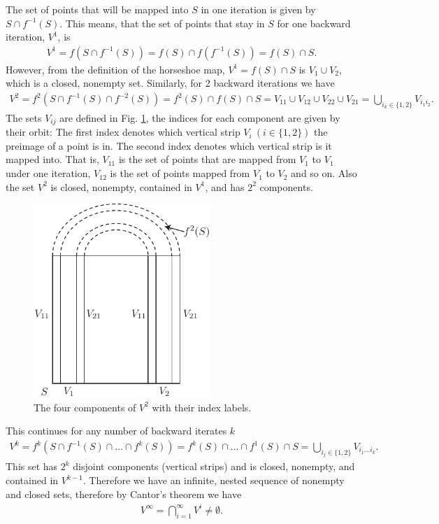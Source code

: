 The set of points that will be mapped into $S$ in one iteration is given by $S\cap f^{-1}(S)$. This means, that the set of points that stay in $S$ for one backward iteration, $V^1$, is
\begin{align}
V^1=f(S\cap f^{-1}(S)) = f(S)\cap f(f^{-1}(S)) = f(S)\cap S.
\end{align}
However, from the definition of the horseshoe map, $V^1 = f(S)\cap S$ is $V_1\cup V_2$, which is a closed, nonempty set. Similarly, for 2 backward iterations we have
\begin{align}
	V^{2} = f^{2}\left(S \cap f^{-1}(S) \cap f^{-2}(S) \right) = f^{2}(S) \cap f(S) \cap S  = V_{11} \cup V_{12} \cup V_{22} \cup V_{21} = \bigcup_{i_k \in \{1,2\}} V_{i_1i_2}.
\end{align}
The sets $V_{ij}$ are defined in Fig. \ref{fig:V_subsets}, the indices for each component are given by their orbit: The first index denotes which vertical strip $V_i\ (i\in \{1,2\})$ the preimage of a point is in. The second index denotes which vertical strip is it mapped into. That is, $V_{11}$ is the set of points that are mapped from $V_1$ to $V_1$ under one iteration, $V_{12}$ is the set of points mapped from $V_1$ to $V_2$ and so on. Also the set $V^{2}$ is closed, nonempty, contained in $V^{1}$, and has $2^2$ components.
\begin{figure}[h!]
	\centering
	\includegraphics[width=0.6\textwidth]{figures/ch6/18V_subsets.pdf}
	\caption{The four components of $V^{2}$ with their index labels.}
	\label{fig:V_subsets}
\end{figure}

This continues for any number of backward iterates $k$ 
\begin{align}
	V^{k} = f^{k}\left(S \cap f^{-1}(S) \cap \ldots \cap f^{k}(S)\right) = f^{k}(S) \cap \ldots \cap f^{1}(S) \cap S = \bigcup_{i_j \in \{1,2\}}V_{i_1 \ldots i_k}.
\end{align}
This set has $2^k$ disjoint components (vertical strips) and is closed, nonempty, and contained in $V^{k-1}$. Therefore we have an infinite, nested sequence of nonempty and closed sets, therefore by Cantor's theorem we have 
\begin{align}
\boxed{
	V^{\infty } = \bigcap_{i=1}^{\infty } V^{i} \neq \emptyset.
}
\end{align}

